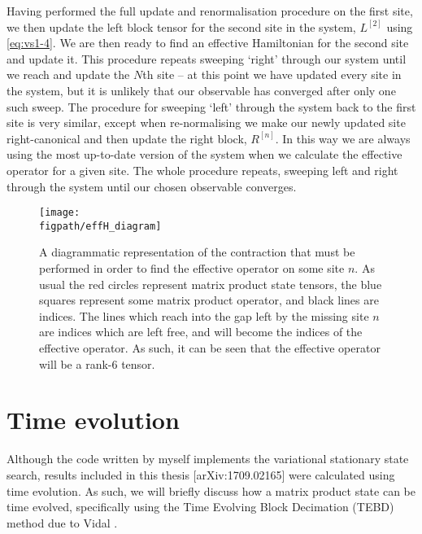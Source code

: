 Having performed the full update and renormalisation procedure on the first site, we then update the left block tensor for the second site in the system, \(L^{[2]}\) using \cref{eq:vs1-4}. We are then ready to find an effective Hamiltonian for the second site and update it. This procedure repeats sweeping `right' through our system until we reach and update the \(N\)th site -- at this point we have updated every site in the system, but it is unlikely that our observable has converged after only one such sweep. The procedure for sweeping `left' through the system back to the first site is very similar, except when re-normalising we make our newly updated site right-canonical and then update the right block, \(R^{[n]}\). In this way we are always using the most up-to-date version of the system when we calculate the effective operator for a given site. The whole procedure repeats, sweeping left and right through the system until our chosen observable converges.

\begin{figure}[ht!]
\centering
\texttt{[image: \\figpath/effH\_diagram]}
\caption{A diagrammatic representation of the contraction that must be performed in order to find the effective operator on some site \(n\). As usual the red circles represent matrix product state tensors, the blue squares represent some matrix product operator, and black lines are indices. The lines which reach into the gap left by the missing site \(n\) are indices which are left free, and will become the indices of the effective operator. As such, it can be seen that the effective operator will be a rank-6 tensor.}
\label{fig:vs1-4}
\end{figure}

\section{Time evolution}
Although the code written by myself implements the variational stationary state search, results included in this thesis [arXiv:1709.02165] were calculated using time evolution. As such, we will briefly discuss how a matrix product state can be time evolved, specifically using the Time Evolving Block Decimation (TEBD) method due to Vidal \cite{Vidal2003}.

